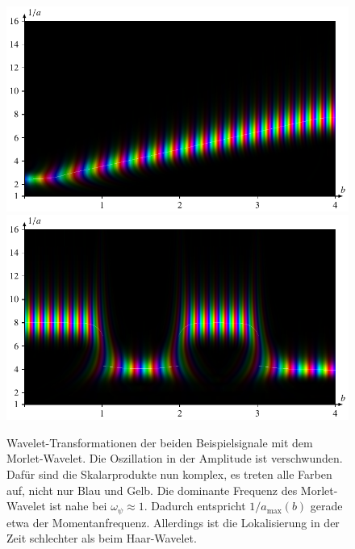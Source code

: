 \begin{figure}
	\centering
	\includegraphics{papers/complex/images/chirp_morlet.pdf}
	\includegraphics{papers/complex/images/square_morlet.pdf}
	\caption{Wavelet-Transformationen der beiden Beispielsignale mit dem Morlet-Wavelet. 
		Die Oszillation in der Amplitude ist verschwunden.
		Dafür sind die Skalarprodukte nun komplex, es treten alle Farben auf, nicht nur Blau und Gelb.
		Die dominante Frequenz des Morlet-Wavelet ist nahe bei $\omega_\psi \approx 1$. 
		Dadurch entspricht $1/a_\text{max}(b)$ gerade etwa der Momentanfrequenz.
		Allerdings ist die Lokalisierung in der Zeit schlechter als beim Haar-Wavelet.}
	\label{complex:morlet-ex}
\end{figure}
